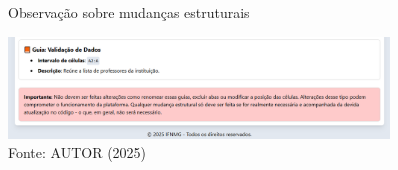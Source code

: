 \begin{figure}[htb]
    \centering
    \caption{Observação sobre mudanças estruturais}
    \includegraphics[width=0.9\textwidth]{Figuras/doc-4.png}
    \caption*{Fonte: AUTOR (2025)}
    \label{fig_doc_4}
\end{figure}